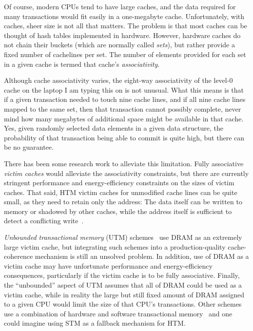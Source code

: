 Of course, modern CPUs tend to have large caches, and the data required
for many transactions would fit easily in a one-megabyte cache.
Unfortunately, with caches, sheer size is not all that matters.
The problem is that most caches
can be thought of hash tables implemented in hardware.
However, hardware caches do not chain their buckets (which are normally
called \emph{sets}), but rather
provide a fixed number of cachelines per set.
The number of elements provided for each set in a given cache
is termed that cache's \emph{associativity}.

Although cache associativity varies, the eight-way associativity of
the level-0 cache on the laptop I am typing this on is not unusual.
What this means is that if a given transaction needed to touch
nine cache lines, and if all nine cache lines mapped to the same
set, then that transaction cannot possibly complete, never mind how
many megabytes of additional space might be available in that cache.
Yes, given randomly selected data elements in a given data structure,
the probability of that transaction being able to commit is quite
high, but there can be no guarantee.

There has been some research work to alleviate this limitation.
Fully associative \emph{victim caches} would alleviate the associativity
constraints, but there are currently stringent performance and
energy-efficiency constraints on the sizes of victim caches.
That said, HTM victim caches for unmodified cache lines can be quite
small, as they need to retain only the address:
The data itself can be written to memory or shadowed by other caches,
while the address itself is sufficient to detect a conflicting
write~\cite{RaviRajwar2012TSX}.

\emph{Unbounded transactional memory} (UTM)
schemes~\cite{CScottAnanian2006,KevinEMoore2006}
use DRAM as an extremely large victim cache, but integrating such schemes
into a production-quality cache-coherence mechanism is still an unsolved
problem.
In addition, use of DRAM as a victim cache may have unfortunate
performance and energy-efficiency consequences, particularly
if the victim cache is to be fully associative.
Finally, the ``unbounded'' aspect of UTM assumes that all of DRAM
could be used as a victim cache, while in reality
the large but still fixed amount of DRAM assigned to a given CPU
would limit the size of that CPU's transactions.
Other schemes use a combination of hardware and software transactional
memory~\cite{SanjeevKumar2006} and one could imagine using STM as a
fallback mechanism for HTM.

